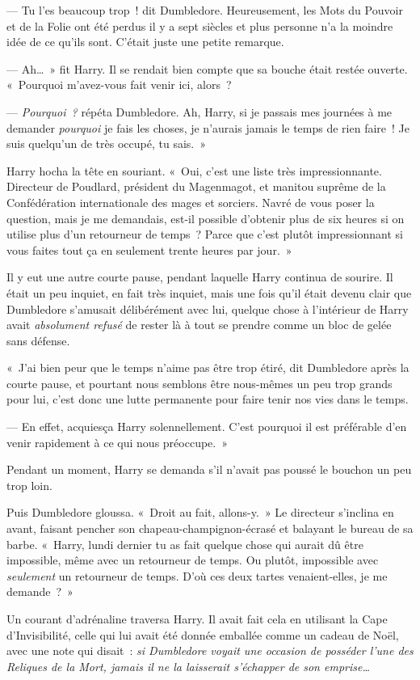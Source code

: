 --- Tu l'es beaucoup trop~! dit Dumbledore.
Heureusement, les Mots du Pouvoir et de la Folie ont été perdus il y a sept siècles et plus personne n'a la moindre idée de ce qu'ils sont.
C'était juste une petite remarque.

--- Ah…~» fit Harry.
Il se rendait bien compte que sa bouche était restée ouverte.
«~Pourquoi m'avez-vous fait venir ici, alors~?

--- \emph{Pourquoi~?} répéta Dumbledore.
Ah, Harry, si je passais mes journées à me demander \emph{pourquoi} je fais les choses, je n'aurais jamais le temps de rien faire~!
Je suis quelqu'un de très occupé, tu sais.~»

Harry hocha la tête en souriant.
«~Oui, c'est une liste très impressionnante.
Directeur de Poudlard, président du Magenmagot, et manitou suprême de la Confédération internationale des mages et sorciers.
Navré de vous poser la question, mais je me demandais, est-il possible d'obtenir plus de six heures si on utilise plus d'un retourneur de temps~?
Parce que c'est plutôt impressionnant si vous faites tout ça en seulement trente heures par jour.~»

Il y eut une autre courte pause, pendant laquelle Harry continua de sourire.
Il était un peu inquiet, en fait très inquiet, mais une fois qu'il était devenu clair que Dumbledore s'amusait délibérément avec lui, quelque chose à l'intérieur de Harry avait \emph{absolument refusé} de rester là à tout se prendre comme un bloc de gelée sans défense.

«~J'ai bien peur que le temps n'aime pas être trop étiré, dit Dumbledore après la courte pause, et pourtant nous semblons être nous-mêmes un peu trop grands pour lui, c'est donc une lutte permanente pour faire tenir nos vies dans le temps.

--- En effet, acquiesça Harry solennellement.
C'est pourquoi il est préférable d'en venir rapidement à ce qui nous préoccupe.~»

Pendant un moment, Harry se demanda s'il n'avait pas poussé le bouchon un peu trop loin.

Puis Dumbledore gloussa.
«~Droit au fait, allons-y.~»
Le directeur s'inclina en avant, faisant pencher son chapeau-champignon-écrasé et balayant le bureau de sa barbe.
«~Harry, lundi dernier tu as fait quelque chose qui aurait dû être impossible, même avec un retourneur de temps.
Ou plutôt, impossible avec \emph{seulement} un retourneur de temps.
D'où ces deux tartes venaient-elles, je me demande~?~»

Un courant d'adrénaline traversa Harry.
Il avait fait cela en utilisant la Cape d'Invisibilité, celle qui lui avait été donnée emballée comme un cadeau de Noël, avec une note qui disait~: \emph{si Dumbledore voyait une occasion de posséder l'une des Reliques de la Mort, jamais il ne la laisserait s'échapper de son emprise…}

